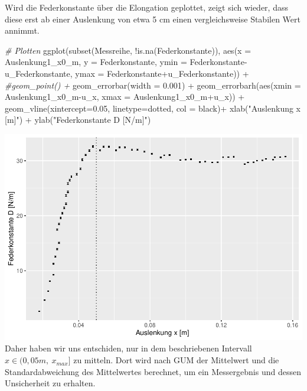 \documentclass[
  9pt,
]{article}
\newenvironment{Shaded}{\begin{snugshade}}{\end{snugshade}}
\newcommand{\AttributeTok}[1]{\textcolor[rgb]{0.77,0.63,0.00}{#1}}
\newcommand{\CommentTok}[1]{\textcolor[rgb]{0.56,0.35,0.01}{\textit{#1}}}
\newcommand{\FloatTok}[1]{\textcolor[rgb]{0.00,0.00,0.81}{#1}}
\newcommand{\FunctionTok}[1]{\textcolor[rgb]{0.00,0.00,0.00}{#1}}
\newcommand{\NormalTok}[1]{#1}
\newcommand{\SpecialCharTok}[1]{\textcolor[rgb]{0.00,0.00,0.00}{#1}}
\newcommand{\StringTok}[1]{\textcolor[rgb]{0.31,0.60,0.02}{#1}}
\begin{document}
Wird die Federkonstante über die Elongation geplottet, zeigt sich
wieder, dass diese erst ab einer Auslenkung von etwa 5 cm einen
vergleichsweise Stabilen Wert annimmt.

\begin{Shaded}
\begin{Highlighting}[]
\CommentTok{\# Plotten}
\FunctionTok{ggplot}\NormalTok{(}\FunctionTok{subset}\NormalTok{(Messreihe, }\SpecialCharTok{!}\FunctionTok{is.na}\NormalTok{(Federkonstante)), }\FunctionTok{aes}\NormalTok{(}\AttributeTok{x =}\NormalTok{ Auslenkung1\_x0\_m, }
                                                      \AttributeTok{y =}\NormalTok{ Federkonstante,}
                                                      \AttributeTok{ymin =}\NormalTok{ Federkonstante}\SpecialCharTok{{-}}\NormalTok{u\_Federkonstante,}
                                                      \AttributeTok{ymax =}\NormalTok{ Federkonstante}\SpecialCharTok{+}\NormalTok{u\_Federkonstante)) }\SpecialCharTok{+} 
  \CommentTok{\#geom\_point() + }
  \FunctionTok{geom\_errorbar}\NormalTok{(}\AttributeTok{width =} \FloatTok{0.001}\NormalTok{) }\SpecialCharTok{+}
  \FunctionTok{geom\_errorbarh}\NormalTok{(}\FunctionTok{aes}\NormalTok{(}\AttributeTok{xmin =}\NormalTok{ Auslenkung1\_x0\_m}\SpecialCharTok{{-}}\NormalTok{u\_x,}
                     \AttributeTok{xmax =}\NormalTok{ Auslenkung1\_x0\_m}\SpecialCharTok{+}\NormalTok{u\_x)) }\SpecialCharTok{+}
  \FunctionTok{geom\_vline}\NormalTok{(}\AttributeTok{xintercept=}\FloatTok{0.05}\NormalTok{, }\AttributeTok{linetype=}\StringTok{\textquotesingle{}dotted\textquotesingle{}}\NormalTok{, }\AttributeTok{col =} \StringTok{\textquotesingle{}black\textquotesingle{}}\NormalTok{)}\SpecialCharTok{+}
  \FunctionTok{xlab}\NormalTok{(}\StringTok{"Auslenkung x [m]"}\NormalTok{) }\SpecialCharTok{+} 
  \FunctionTok{ylab}\NormalTok{(}\StringTok{"Federkonstante D [N/m]"}\NormalTok{)}
\end{Highlighting}
\end{Shaded}

\includegraphics{DehnbareStoffe_files/figure-latex/unnamed-chunk-8-1.pdf}
Daher haben wir uns entschiden, nur in dem beschriebenen Intervall
\(x \in (0,05m,\ x_{max}]\) zu mitteln. Dort wird nach GUM der
Mittelwert und die Standardabweichung des Mittelwertes berechnet, um ein
Messergebnis und dessen Unsicherheit zu erhalten.
\end{document}
